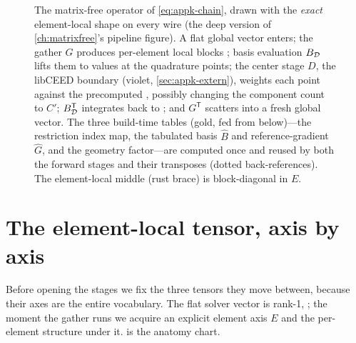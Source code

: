 \begin{figure}[p]
{%
}
\caption[The five-stage pipeline with exact tensor shapes]{The matrix-free
operator of \cref{eq:appk-chain}, drawn with the \emph{exact} element-local shape
on every wire (the deep version of \cref{ch:matrixfree}'s pipeline figure). A flat
global vector \code{[(N: \dots)]} enters; the gather $G$ produces per-element local
blocks \code{[(E, L)]}; basis evaluation $B_{\mathcal{D}}$ lifts them to
\code{[(E, P, C)]} values at the quadrature points; the center stage $D$, the
 libCEED boundary (violet, \cref{sec:appk-extern}), weights each
point against the precomputed , possibly changing the component
count to $C'$; $B_{\mathcal{D}}^{\mathsf T}$ integrates back to \code{[(E, L)]}; and
$G^{\mathsf T}$ scatters into a fresh global vector. The three build-time tables
(gold, fed from below)---the restriction index map, the tabulated basis $\hat B$
and reference-gradient $\hat G$, and the geometry factor---are computed once and
reused by both the forward stages and their transposes (dotted back-references).
The element-local middle (rust brace) is block-diagonal in $E$.}
\label{fig:appk-pipeline}
\end{figure}

\section{The element-local tensor, axis by axis}
\label{sec:appk-anatomy}

Before opening the stages we fix the three tensors they move between, because
their axes are the entire vocabulary. The flat solver vector is rank-1,
\code{[(N: \dots)]}; the moment the gather runs we acquire an explicit element
axis $E$ and the per-element structure under it.  is the
anatomy chart.

